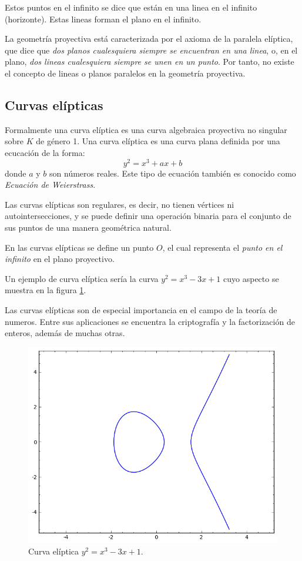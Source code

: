 \documentclass[a4,12pt]{article}
\begin{document}
Estos puntos en el infinito se dice que están en una linea en el infinito (horizonte). Estas lineas forman el plano en el infinito.

La geometría proyectiva está caracterizada por el axioma de la paralela elíptica, que dice que \emph{dos planos cualesquiera siempre se encuentran en una linea}, o, en el plano, \emph{dos lineas cualesquiera siempre se unen en un punto}. Por tanto, no existe el concepto de lineas o planos paralelos en la geometría proyectiva.


\subsection{Curvas elípticas}
Formalmente una curva elíptica es una curva algebraica proyectiva no singular sobre $K$ de género 1. Una curva elíptica es una curva plana definida por una ecucación de la forma: $$y^{2}=x^{3}+ax+b$$ donde $a$ y $b$ son números reales. Este tipo de ecuación también es conocido como \emph{Ecuación de Weierstrass}.

Las curvas elípticas son regulares, es decir, no tienen vértices ni autointersecciones, y se puede definir una operación binaria para el conjunto de sus puntos de una manera geométrica natural.

En las curvas elípticas se define un punto $O$, el cual representa el \emph{punto en el infinito} en el plano proyectivo.

Un ejemplo de curva elíptica sería la curva $y^2=x^3-3x+1$ cuyo aspecto se muestra en la figura \ref{fig:curvaeliptica}.

Las curvas elípticas son de especial importancia en el campo de la teoría de numeros. Entre sus aplicaciones se encuentra la criptografía y la factorización de enteros\cite{cosset10}, además de muchas otras.

\begin{figure}
\begin{center}
\includegraphics[width=0.5\linewidth]{imagenes/curvaeliptica}
\end{center}
\caption{Curva elíptica $y^2=x^3-3x+1$.}
\label{fig:curvaeliptica}
\end{figure}
\end{document}
